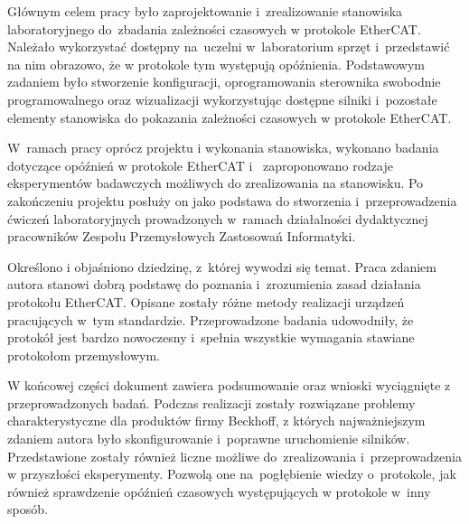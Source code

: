 Głównym celem pracy było zaprojektowanie i~zrealizowanie stanowiska laboratoryjnego do~zbadania zależności czasowych w protokole EtherCAT. Należało wykorzystać dostępny na~uczelni w~laboratorium sprzęt i~przedstawić na nim obrazowo, że w protokole tym występują opóźnienia. 
Podstawowym zadaniem było stworzenie konfiguracji, oprogramowania sterownika swobodnie programowalnego oraz wizualizacji wykorzystując dostępne silniki i~pozostałe elementy stanowiska do pokazania zależności czasowych w protokole EtherCAT.

W~ramach pracy oprócz projektu i wykonania stanowiska, wykonano badania dotyczące opóźnień w protokole EtherCAT i~ zaproponowano rodzaje eksperymentów badawczych możliwych do zrealizowania na stanowisku.
Po zakończeniu projektu posłuży on jako podstawa do stworzenia i~przeprowadzenia ćwiczeń laboratoryjnych prowadzonych w~ramach działalności dydaktycznej pracowników Zespołu Przemysłowych Zastosowań Informatyki.

Określono i objaśniono dziedzinę, z~której wywodzi się temat. Praca zdaniem autora stanowi dobrą podstawę do poznania i~zrozumienia zasad działania protokołu EtherCAT. Opisane zostały różne metody realizacji urządzeń pracujących w~tym standardzie. Przeprowadzone badania udowodniły, że protokół jest bardzo nowoczesny i~spełnia wszystkie wymagania stawiane protokołom przemysłowym.

W końcowej części dokument zawiera podsumowanie oraz wnioski wyciągnięte z przeprowadzonych badań. Podczas realizacji zostały rozwiązane problemy charakterystyczne dla produktów firmy Beckhoff, z których najważniejszym zdaniem autora było skonfigurowanie i~poprawne uruchomienie silników. Przedstawione zostały również liczne możliwe do~zrealizowania i~przeprowadzenia w przyszłości eksperymenty. Pozwolą one na~pogłębienie wiedzy o~protokole, jak również sprawdzenie opóźnień czasowych występujących w protokole w~inny sposób.
\clearpage